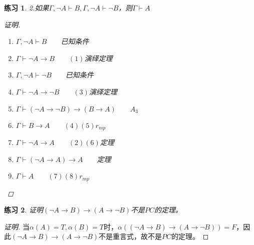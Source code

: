 \documentclass{article}
\newtheorem{Exercise}{练习}
\begin{document}
\begin{CJK*}{UTF8}{gbsn}
\begin{Exercise}
2.如果$\Gamma, \lnot A\vdash B, \Gamma, \lnot A\vdash \lnot B$，则$\Gamma\vdash A$

\begin{proof}[证明]
  $\qquad$
\begin{enumerate}
  \item $\Gamma, \lnot A\vdash B\qquad$已知条件
  \item $\Gamma\vdash \lnot A\to B\qquad (1)$演绎定理
  \item $\Gamma, \lnot A\vdash \lnot B\qquad$已知条件
  \item $\Gamma\vdash \lnot A\to \lnot B\qquad(3)$演绎定理
  \item  $\Gamma\vdash (\lnot A\to \lnot B)\to (B\to A)\qquad A_3$
  \item $\Gamma\vdash B\to A\qquad(4)(5)r_{mp}$
  \item $\Gamma\vdash \lnot A\to A\qquad(2)(6)$定理
  \item $\Gamma\vdash (\lnot A\to A)\to A\qquad$定理
  \item $\Gamma \vdash A\qquad (7)(8)r_{mp}$
\end{enumerate}
\end{proof}

\end{Exercise}



\begin{Exercise}
  证明$(\lnot A\to B)\to (A\to \lnot B)$不是$PC$的定理。
\end{Exercise}
\begin{proof}[证明]
  当$\alpha(A)=T,\alpha(B)=T$时，$\alpha((\lnot A\to B)\to (A\to \lnot B))=F$，因此$(\lnot A\to B)\to (A\to \lnot B)$不是重言式，故不是$PC$的定理。
\end{proof}
\end{CJK*}
\end{document}
